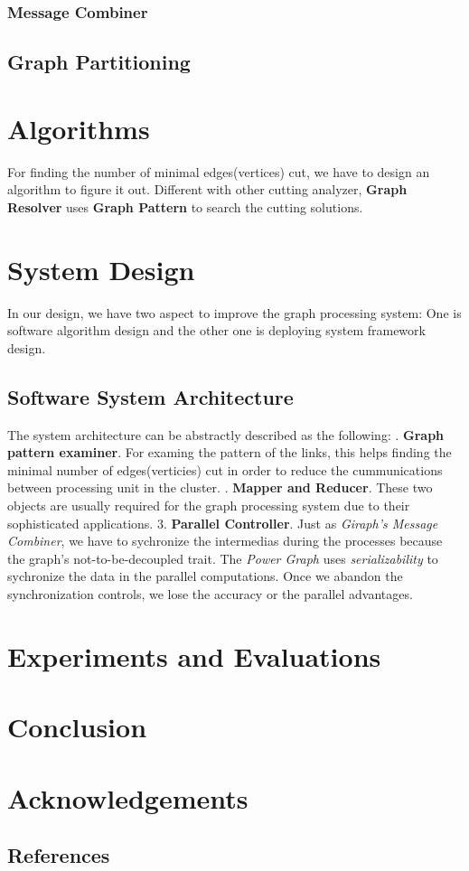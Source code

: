 \documentclass{article}
\begin{document}
	\subsubsection{Message Combiner}
	\subsection{Graph Partitioning}

	\section{Algorithms}
	For finding the number of minimal edges(vertices) cut, we have to design an algorithm to figure it out. Different with other cutting analyzer, \textbf{Graph Resolver} uses \textbf{Graph Pattern}\cite{yan2008mining} to search the cutting solutions.

	\section{System Design}
	In our design, we have two aspect to improve the graph processing system: One is software algorithm design and the other one is deploying system framework design.
	\subsection{Software System Architecture}
	The system architecture can be abstractly described as the following:
	. \textbf{Graph pattern examiner}. For examing the pattern of the links, this helps finding the minimal number of edges(verticies) cut in order to reduce the cummunications between processing unit in the cluster.
	. \textbf{Mapper and Reducer}. These two objects are usually required for the graph processing system due to their sophisticated applications.
	3. \textbf{Parallel Controller}. Just as \emph{Giraph's Message Combiner}, we have to sychronize the intermedias during the processes because the graph's not-to-be-decoupled trait. The \emph{Power Graph} uses \emph{serializability} to sychronize the data in the parallel computations. Once we abandon the synchronization controls, we lose the accuracy or the parallel advantages.

	\section{Experiments and Evaluations}

	\section{Conclusion}

	\section{Acknowledgements}

	\begin{appendix}
		\section{References}
		
		
	\end{appendix}
\end{document}
